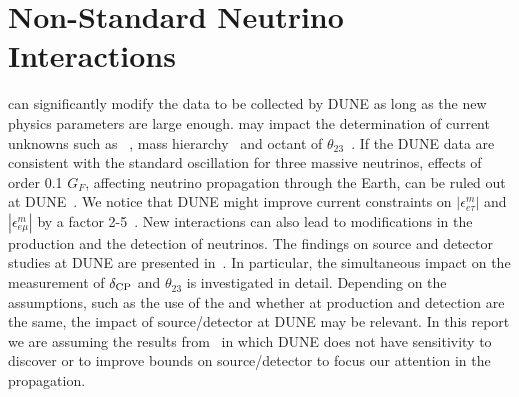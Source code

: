 \section{Non-Standard Neutrino Interactions}
\label{sec:nsi}
 can significantly modify the data to be collected by DUNE as long as the new physics parameters are large enough.  may impact the determination of current unknowns such as ~\cite{Masud:2015xva,Masud:2016bvp}, mass hierarchy~\cite{Masud:2016gcl} and octant of $\theta_{23}$~\cite{Agarwalla:2016fkh}. If the DUNE data are consistent with the standard oscillation for three massive neutrinos,  effects of order 0.1 $G_F$, affecting neutrino propagation through the Earth, can be ruled out at DUNE~\cite{deGouvea:2015ndi,Coloma:2015kiu}. We notice that DUNE might improve current constraints on $|\epsilon^m_{e \tau}|$ and $|\epsilon^m_{e \mu}|$ by a factor 2-5~\cite{Ohlsson:2012kf,Miranda:2015dra,Farzan:2017xzy}. New    interactions can also lead to modifications in the production and the detection of neutrinos. The findings on source and detector  studies at DUNE are presented in~\cite{Blennow:2016etl,Bakhti:2016gic}. In particular, the simultaneous impact on the measurement of $\delta_{\rm CP}$ and $\theta_{23}$ is investigated in detail. Depending on the assumptions, such as the use of the   and whether  at production and detection are the same, the impact of source/detector  at DUNE may be relevant. In this report we are assuming the results from~\cite{Blennow:2016etl} in which DUNE does not have sensitivity to discover or to improve bounds on source/detector  to focus our attention in the propagation.

